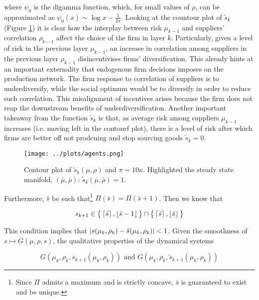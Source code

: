 \documentclass[../../main.tex]{subfiles}
\begin{document}
where $\psi_0$ is the digamma function, which, for small values of $\rho$, can be approximated as $\psi_0(x) \sim \log x - \frac{1}{2x}$. Looking at the countour plot of $\tilde{s}_k$ (Figure \ref{fig:agents-optimum}) it is clear how the interplay between risk $\mu_{k - 1}$ and suppliers' correlation $\rho_{k - 1}$ affect the choice of the firm in layer $k$. Particularly, given a level of risk in the previous layer $\mu_{k - 1}$, an increase in correlation among suppliers in the previous layer $\rho_{k - 1}$ disincentivises firms' diversification. This already hints at an important externality that endogenous firm decisions imposes on the production network. The firm response to correlation of suppliers is to underdiversify, while the social optimum would be to diversify in order to reduce such correlation. This misalignment of incentives arises because the firm does not reap the downstream benefits of underdiversification. Another important takeaway from the function $\tilde{s}_k$ is that, as average risk among suppliers $\mu_{k - 1}$ increases (i.e. moving left in the contourf plot), there is a level of risk after which firms are better off not prodcuing and stop sourcing goods $\tilde{s}_k = 0$.

\begin{figure}[H]
  \centering
  \texttt{[image: ../plots/agents.png]}
  \caption{Contour plot of $\tilde{s}_k(\mu, \rho)$ and $\pi = 10 \kappa$. Highlighted the steady state manifold, $(\bar{\mu}, \bar{\rho})$: $\tilde{s}_k(\bar{\mu}, \bar{\rho}) = 1$.}
  \label{fig:agents-optimum}
\end{figure}

\iffalse
  Furthermore, $\bar{s}$ be such that\footnote{Since $\Pi$ admits a maximum and is strictly concave, $\bar{s}$ is guaranteed to exist and be unique.} $\Pi(\bar{s}) = \Pi(\bar{s} + 1)$. Then we know that 

  \begin{equation}
    s_{k + 1} \in \big\{ \left\lceil\bar{s}\right\rceil, \left\lfloor\bar{s} - 1\right\rfloor \big\} \cap \big\{ \left\lceil\tilde{s}\right\rceil, \left\lfloor\tilde{s}\right\rfloor \big\}
  \end{equation}

  This condition implies that $\left\lvert s(\mu_k, \rho_k) - \tilde{s}(\mu_k, \rho_k)\right\rvert < 1$. Given the smoothness of $s \mapsto G(\mu, \rho, s)$, the qualitative properties of the dynamical systems

  \begin{equation*}
      G(\mu_k, \rho_k, s_{k + 1}(\mu_k, \rho_k)) \text{ and } G(\mu_k, \rho_k, \tilde{s}_{k + 1}(\mu_k, \rho_k))
  \end{equation*}
\end{document}
